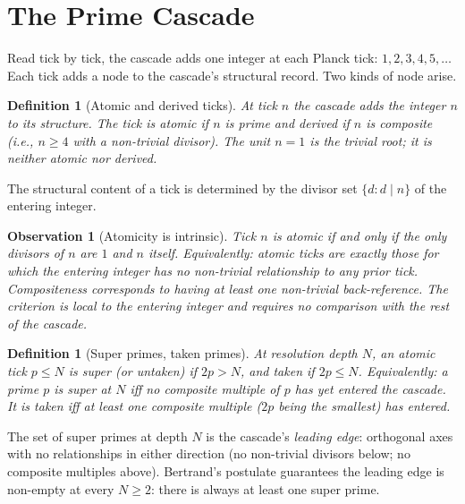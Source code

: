 \documentclass[11pt,a4paper]{article}
\newtheorem{definition}[theorem]{Definition}
\newtheorem{observation}[theorem]{Observation}
\begin{document}
\section{The Prime Cascade}\label{sec:prime-cascade}

Read tick by tick, the cascade adds one integer at each Planck tick:
$1, 2, 3, 4, 5, \ldots$ Each tick adds a node to the cascade's
structural record. Two kinds of node arise.

\begin{definition}[Atomic and derived ticks]\label{def:atomic-derived}
At tick $n$ the cascade adds the integer $n$ to its structure. The
tick is \emph{atomic} if $n$ is prime and \emph{derived} if $n$ is
composite (i.e., $n \geq 4$ with a non-trivial divisor). The unit
$n = 1$ is the trivial root; it is neither atomic nor derived.
\end{definition}

The structural content of a tick is determined by the divisor set
$\{d : d \mid n\}$ of the entering integer.

\begin{observation}[Atomicity is intrinsic]\label{obs:atomic-intrinsic}
Tick $n$ is atomic if and only if the only divisors of $n$ are $1$
and $n$ itself. Equivalently: atomic ticks are exactly those for
which the entering integer has no non-trivial relationship to any
prior tick. Compositeness corresponds to having at least one
non-trivial back-reference. The criterion is local to the entering
integer and requires no comparison with the rest of the cascade.
\end{observation}

\begin{definition}[Super primes, taken primes]\label{def:super-taken}
At resolution depth $N$, an atomic tick $p \leq N$ is \emph{super}
(or \emph{untaken}) if $2p > N$, and \emph{taken} if $2p \leq N$.
Equivalently: a prime $p$ is super at $N$ iff no composite multiple
of $p$ has yet entered the cascade. It is taken iff at least one
composite multiple ($2p$ being the smallest) has entered.
\end{definition}

\noindent The set of super primes at depth $N$ is the cascade's
\emph{leading edge}: orthogonal axes with no relationships in either
direction (no non-trivial divisors below; no composite multiples
above). Bertrand's postulate guarantees the leading edge is
non-empty at every $N \geq 2$: there is always at least one super
prime.
\end{document}
